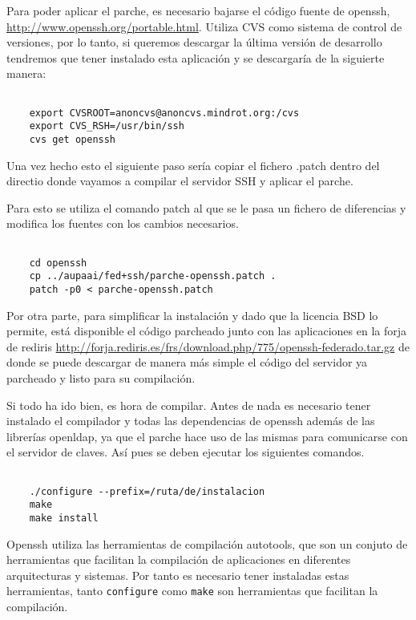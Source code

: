     Para poder aplicar el parche, es necesario bajarse el código
    fuente de openssh, \url{http://www.openssh.org/portable.html}.
    Utiliza CVS como sistema de control de versiones, por lo tanto, si
    queremos descargar la última versión de desarrollo tendremos que
    tener instalado esta aplicación y se descargaría de la siguierte
    manera:

    \begin{verbatim}

    export CVSROOT=anoncvs@anoncvs.mindrot.org:/cvs
    export CVS_RSH=/usr/bin/ssh
    cvs get openssh

    \end{verbatim}

    Una vez hecho esto el siguiente paso sería copiar el fichero
    .patch dentro del directio donde vayamos a compilar el
    servidor SSH y aplicar el parche.

    Para esto se utiliza el comando patch al que se le pasa un fichero
    de diferencias y modifica los fuentes con los cambios necesarios.

    \begin{verbatim}
    
    cd openssh
    cp ../aupaai/fed+ssh/parche-openssh.patch .
    patch -p0 < parche-openssh.patch

    \end{verbatim}

    Por otra parte, para simplificar la instalación y dado que la
    licencia BSD lo permite, está disponible el código parcheado
    junto con las aplicaciones en la forja de rediris
    \url{http://forja.rediris.es/frs/download.php/775/openssh-federado.tar.gz}
    de donde se puede descargar de manera más simple el código del
    servidor ya parcheado y listo para su compilación.

    Si todo ha ido bien, es hora de compilar. Antes de nada es
    necesario tener instalado el compilador y todas las
    dependencias de openssh además de las librerías openldap, ya
    que el parche hace uso de las mismas para comunicarse con el
    servidor de claves. Así pues se deben ejecutar los siguientes
    comandos.

    \begin{verbatim}

    ./configure --prefix=/ruta/de/instalacion
    make
    make install

    \end{verbatim}

    Openssh utiliza las herramientas de compilación autotools, que son
    un conjuto de herramientas que facilitan la compilación de
    aplicaciones en diferentes arquitecturas y sistemas. Por tanto es
    necesario tener instaladas estas herramientas, tanto
    \texttt{configure} como \texttt{make} son herramientas que
    facilitan la compilación.

